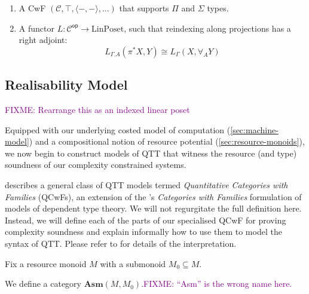 \documentclass[acmsmall,review]{acmart}
\newcommand{\cat}[1]{\mathcal{#1}}
\newcommand{\op}{\mathsf{op}}
\newcommand{\LinPoset}{\mathrm{LinPoset}}
\newcommand{\bob}[1]{\textcolor{purple}{FIXME: #1}}
\begin{document}
\begin{definition}
  \begin{enumerate}
  \item A CwF $(\cat{C}, \top, \langle-,-\rangle, ...)$ that supports
    $\Pi$ and $\Sigma$ types.
  \item A functor $L : \cat{C}^\op \to \LinPoset$, such that
    reindexing along projections has a right adjoint:
    \begin{displaymath}
      L_{\Gamma.A}(\pi^*X, Y) \cong L_{\Gamma}(X, \forall_A Y)
    \end{displaymath}
  \end{enumerate}
\end{definition}


\subsection{Realisability Model}
\label{sec:realisability-model}

\bob{Rearrange this as an indexed linear poset}

Equipped with our underlying costed model of computation
(\autoref{sec:machine-model}) and a compositional notion of resource
potential (\autoref{sec:resource-monoids}), we now begin to construct
models of QTT that witness the resource (and type) soundness of our
complexity constrained systems.




\bigskip

\cite{atkey18qtt} describes a general class of QTT models termed
\emph{Quantitative Categories with Families} (QCwFs), an extension of
the \cite{dyber}'s \emph{Categories with Families} formulation of
models of dependent type theory. We will not regurgitate the full
definition here. Instead, we will define each of the parts of our
specialised QCwF for proving complexity soundness and explain
informally how to use them to model the syntax of QTT. Please refer to
\cite{atkey18qtt} for details of the interpretation.

Fix a resource monoid $M$ with a submonoid $M_0 \subseteq M$.

We define a category $\mathbf{Asm}(M,M_0)$.\bob{``Asm'' is the wrong
  name here.}
\end{document}

